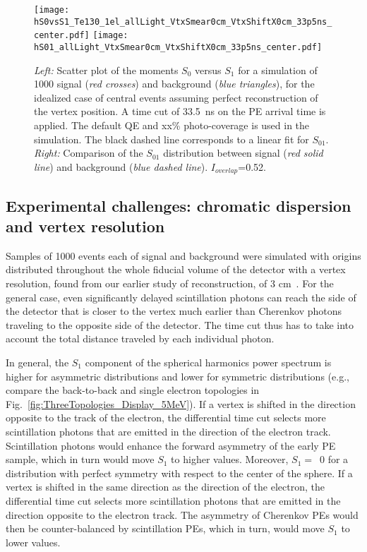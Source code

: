 \begin{figure*}[h]
  \centering
  \texttt{[image: hS0vsS1\_Te130\_1el\_allLight\_VtxSmear0cm\_VtxShiftX0cm\_33p5ns\_center.pdf]}
  \texttt{[image: hS01\_allLight\_VtxSmear0cm\_VtxShiftX0cm\_33p5ns\_center.pdf]}
  \caption{\emph{Left:} Scatter plot of the moments $S_0$ versus $S_1$
    for a simulation of 1000 signal (\emph{red crosses}) and
    background (\emph{blue triangles}), for the idealized case of
    central events assuming perfect reconstruction of the vertex
    position. A time cut of 33.5~ns on the PE arrival time is
    applied. The default QE and xx\% photo-coverage is used in the
    simulation.  The black dashed line corresponds to a linear fit for
    $S_{01}$.  \emph{Right:} Comparison of the $S_{01}$ distribution
    between signal (\emph{red solid line}) and background (\emph{blue
    dashed line}).  $I_{overlap}$=0.52.}
\label{fig:SL_Te_33p5ns_center}
\end{figure*}


\subsection{Experimental challenges: chromatic dispersion and 
vertex resolution}

Samples of 1000 events each of signal and background were simulated
with origins distributed throughout the whole fiducial volume of the
detector with a vertex resolution, found from our earlier study of
reconstruction, of 3 cm~\cite{Aberle2014}.  For the general case, even
significantly delayed scintillation photons can reach the side of the
detector that is closer to the vertex much earlier than Cherenkov
photons traveling to the opposite side of the detector. The time cut
thus has to take into account the total distance traveled by each
individual photon.

In general, the $S_1$ component of the spherical harmonics power
spectrum is higher for asymmetric distributions and lower for
symmetric distributions (e.g., compare the back-to-back and single
electron topologies in
Fig.~\ref{fig:ThreeTopologies_Display_5MeV}). If a vertex is shifted
in the direction opposite to the track of the electron, the
differential time cut selects more scintillation photons that are
emitted in the direction of the electron track.  Scintillation photons
would enhance the forward asymmetry of the early PE sample, which
in turn would move $S_1$ to higher values.  Moreover, $S_1=$~0 for a
distribution with perfect symmetry with respect to the center of the
sphere.  If a vertex is shifted in the same direction as the direction
of the electron, the differential time cut selects more scintillation
photons that are emitted in the direction opposite to the electron
track. The asymmetry of Cherenkov PEs would then be counter-balanced
by scintillation PEs, which in turn, would move $S_1$ to lower values.


